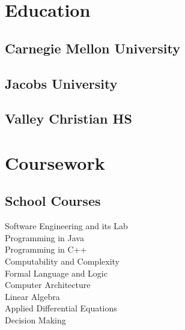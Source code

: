 \documentclass[]{deedy-resume-openfont}
\begin{document}
%
%
\lastupdated

%
%



%
%

\begin{minipage}[t]{0.33\textwidth} 


\section{Education} 
\subsection{\normalsize{Carnegie Mellon University}}
\sectionsep

\subsection{Jacobs University}
\sectionsep

\subsection{Valley Christian HS}
\sectionsep


\section{Coursework}

\subsection{School Courses}
Software Engineering and its Lab \\
Programming in Java \\
Programming in C++ \\
Computability and Complexity \\
Formal Language and Logic \\
Computer Architecture \\ 
Linear Algebra \\
Applied Differential Equations \\ 
Decision Making
 

\end{minipage}
\end{document}
